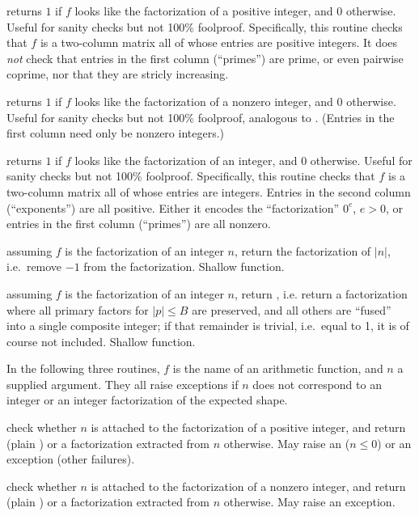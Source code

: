  returns $1$ if $f$ looks like the
factorization of a positive integer, and $0$ otherwise. Useful for sanity
checks but not 100\% foolproof. Specifically, this routine checks that $f$ is
a two-column matrix all of whose entries are positive integers. It does
\emph{not} check that entries in the first column (``primes'') are prime,
or even pairwise coprime, nor that they are stricly increasing.

 returns $1$ if $f$ looks like the
factorization of a nonzero integer, and $0$ otherwise. Useful for sanity
checks but not 100\% foolproof, analogous to . (Entries
in the first column need only be nonzero integers.)

 returns $1$ if $f$ looks like the
factorization of an integer, and $0$ otherwise. Useful for sanity
checks but not 100\% foolproof. Specifically, this routine checks that $f$ is
a two-column matrix all of whose entries are integers. Entries in the second
column (``exponents'') are all positive. Either it encodes the
``factorization'' $0^e$, $e > 0$, or entries in the first column (``primes'')
are all nonzero.

 assuming $f$ is the factorization of an
integer $n$, return the factorization of $|n|$, i.e.~remove $-1$ from the
factorization. Shallow function.

 assuming $f$ is the
factorization of an integer $n$, return , i.e.
return a factorization where all primary factors for $|p| \leq B$
are preserved, and all others are ``fused'' into a single composite
integer; if that remainder is trivial, i.e.~equal to 1, it is of course
not included. Shallow function.

In the following three routines, $f$ is the name of an arithmetic function,
and $n$ a supplied argument. They all raise exceptions if $n$ does not
correspond to an integer or an integer factorization of the expected shape.

 check whether $n$
is attached to the factorization of a positive integer, and return
 (plain ) or a factorization extracted from $n$ otherwise.
May raise an  ($n \leq 0$) or an  exception (other
failures).

 check whether $n$
is attached to the factorization of a nonzero integer, and return
 (plain ) or a factorization extracted from $n$ otherwise.
May raise an  exception.

